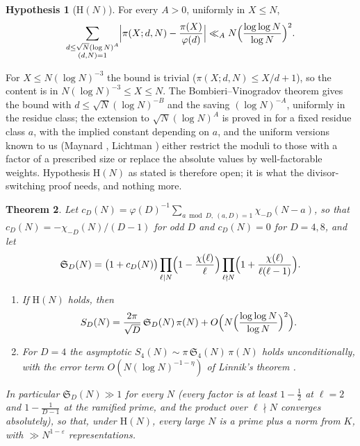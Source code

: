 \documentclass[11pt]{amsart}
\newtheorem{theorem}{Theorem}[section]
\theoremstyle{definition}
\newtheorem{hypothesis}[theorem]{Hypothesis}
\theoremstyle{remark}
\newcommand{\e}{\varepsilon}
\newcommand{\sS}{\mathfrak S}
\begin{document}
\begin{hypothesis}[$\mathrm{H}(N)$]\label{hyp}
For every $A>0$, uniformly in $X\le N$,
\[
\sum_{\substack{d\le\sqrt N(\log N)^A\\ (d,N)=1}}\Bigl|\pi(X;d,N)-\frac{\pi(X)}{\varphi(d)}\Bigr|\ll_A N\Bigl(\frac{\log\log N}{\log N}\Bigr)^2 .
\]
\end{hypothesis}

For $X\le N(\log N)^{-3}$ the bound is trivial ($\pi(X;d,N)\le X/d+1$), so the content is in $N(\log N)^{-3}\le X\le N$. The Bombieri--Vinogradov theorem gives the bound with $d\le\sqrt N(\log N)^{-B}$ and the saving $(\log N)^{-A}$, uniformly in the residue class; the extension to $\sqrt N(\log N)^{A}$ is proved in \cite{BFI89} for a fixed residue class $a$, with the implied constant depending on $a$, and the uniform versions known to us (Maynard \cite{Maynard20}, Lichtman \cite{Lichtman23}) either restrict the moduli to those with a factor of a prescribed size or replace the absolute values by well-factorable weights. Hypothesis $\mathrm H(N)$ as stated is therefore open; it is what the divisor-switching proof needs, and nothing more.

\begin{theorem}\label{thm:main}
Let $c_D(N)=\varphi(D)^{-1}\sum_{a\bmod D,\ (a,D)=1}\chi_{-D}(N-a)$, so that $c_D(N)=-\chi_{-D}(N)/(D-1)$ for odd $D$ and $c_D(N)=0$ for $D=4,8$, and let
\[
\sS_D(N)=\bigl(1+c_D(N)\bigr)\prod_{\ell\mid N}\Bigl(1-\frac{\chi(\ell)}\ell\Bigr)\prod_{\ell\nmid N}\Bigl(1+\frac{\chi(\ell)}{\ell(\ell-1)}\Bigr).
\]
\begin{enumerate}[label=\textup{(\roman*)},leftmargin=2.2em]
\item If $\mathrm H(N)$ holds, then
\[
S_D(N)=\frac{2\pi}{\sqrt D}\,\sS_D(N)\,\pi(N)+O\Bigl(N\Bigl(\frac{\log\log N}{\log N}\Bigr)^2\Bigr).
\]
\item For $D=4$ the asymptotic $S_4(N)\sim\pi\,\sS_4(N)\,\pi(N)$ holds unconditionally, with the error term $O(N(\log N)^{-1-\eta})$ of Linnik's theorem \cite[Chapter~7]{Linnik}.
\end{enumerate}
In particular $\sS_D(N)\gg1$ for every $N$ (every factor is at least $1-\frac12$ at $\ell=2$ and $1-\frac1{D-1}$ at the ramified prime, and the product over $\ell\nmid N$ converges absolutely), so that, under $\mathrm H(N)$, every large $N$ is a prime plus a norm from $K$, with $\gg N^{1-\e}$ representations.
\end{theorem}
\end{document}
